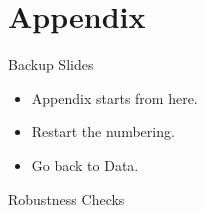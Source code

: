 \documentclass[aspectratio=169,11pt]{beamer}
\begin{document}
\section{Appendix}
\appendix
\begin{frame}[label=data_appendix]{Backup Slides}
\begin{itemize}
    \item Appendix starts from here.
    \item Restart the numbering.
    \item Go back to Data. \hyperlink{data}{}   
\end{itemize}
\end{frame}

\begin{frame}{Robustness Checks}

\end{frame}
\end{document}
